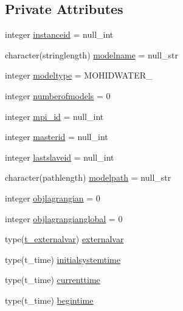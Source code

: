 \subsection*{Private Attributes}
\begin{DoxyCompactItemize}
\item 
integer \mbox{\hyperlink{structmodulemodel_1_1t__model_ad6d22a43d983387940ca22d9880ce69c}{instanceid}} = null\+\_\+int
\item 
character(stringlength) \mbox{\hyperlink{structmodulemodel_1_1t__model_a104eca470fd8a81f5006e385e2b99f87}{modelname}} = null\+\_\+str
\item 
integer \mbox{\hyperlink{structmodulemodel_1_1t__model_aad38662895de503682769b2bd867bd9c}{modeltype}} = M\+O\+H\+I\+D\+W\+A\+T\+E\+R\+\_\+
\item 
integer \mbox{\hyperlink{structmodulemodel_1_1t__model_a7a636b255bbd22b5feeb053caa3b16c4}{numberofmodels}} = 0
\item 
integer \mbox{\hyperlink{structmodulemodel_1_1t__model_ab68297186bd9e3c23e102f6d4286c552}{mpi\+\_\+id}} = null\+\_\+int
\item 
integer \mbox{\hyperlink{structmodulemodel_1_1t__model_a442d78f3b30f13329969c2eec2c0c72a}{masterid}} = null\+\_\+int
\item 
integer \mbox{\hyperlink{structmodulemodel_1_1t__model_a18cfb692e8554d8d77f136a7f51f06da}{lastslaveid}} = null\+\_\+int
\item 
character(pathlength) \mbox{\hyperlink{structmodulemodel_1_1t__model_a28eccfff4ce13195e73d642fbdbc6f9d}{modelpath}} = null\+\_\+str
\item 
integer \mbox{\hyperlink{structmodulemodel_1_1t__model_ac2bb9a90664c4847c37f38e5f77ce2ef}{objlagrangian}} = 0
\item 
integer \mbox{\hyperlink{structmodulemodel_1_1t__model_ab7d6bbfaef8e48a713ef2cd776b4f703}{objlagrangianglobal}} = 0
\item 
type(\mbox{\hyperlink{structmodulemodel_1_1t__externalvar}{t\+\_\+externalvar}}) \mbox{\hyperlink{structmodulemodel_1_1t__model_ac782ecd9cabec8dd2463b2d7ff0114ce}{externalvar}}
\item 
type(t\+\_\+time) \mbox{\hyperlink{structmodulemodel_1_1t__model_a52faeebea01b4d6105c3c4071d5cfd24}{initialsystemtime}}
\item 
type(t\+\_\+time) \mbox{\hyperlink{structmodulemodel_1_1t__model_a50849fb7dea79490fdf4bab45d1c7d1b}{currenttime}}
\item 
type(t\+\_\+time) \mbox{\hyperlink{structmodulemodel_1_1t__model_a7c04d7ca0dd9c4fe0fbdd0bd4f7e973b}{begintime}}

\end{DoxyCompactItemize}
